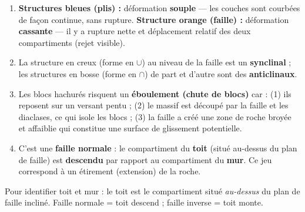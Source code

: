 \documentclass[11pt]{article}
\begin{document}
\begin{corrige}
\tcblower
\begin{enumerate}
\item \textbf{Structures bleues (plis) :} déformation \textbf{souple} — les couches sont courbées de façon continue, sans rupture. \textbf{Structure orange (faille) :} déformation \textbf{cassante} — il y a rupture nette et déplacement relatif des deux compartiments (rejet visible).
\item La structure en creux (forme en $\cup$) au niveau de la faille est un \textbf{synclinal} ; les structures en bosse (forme en $\cap$) de part et d'autre sont des \textbf{anticlinaux}.
\item Les blocs hachurés risquent un \textbf{éboulement (chute de blocs)} car : (1) ils reposent sur un versant pentu ; (2) le massif est découpé par la faille et les diaclases, ce qui isole les blocs ; (3) la faille a créé une zone de roche broyée et affaiblie qui constitue une surface de glissement potentielle.
\item C'est une \textbf{faille normale} : le compartiment du \textbf{toit} (situé au-dessus du plan de faille) est \textbf{descendu} par rapport au compartiment du \textbf{mur}. Ce jeu correspond à un étirement (extension) de la roche.
\end{enumerate}
\end{corrige}
\begin{attention}
Pour identifier toit et mur : le toit est le compartiment situé \emph{au-dessus} du plan de faille incliné. Faille normale = toit descend ; faille inverse = toit monte.
\end{attention}
\end{document}
